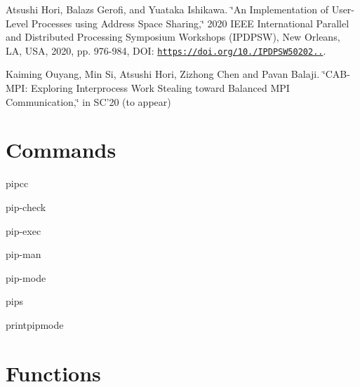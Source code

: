 Atsushi Hori, Balazs Gerofi, and Yuataka Ishikawa. \char`\"{}\-An Implementation
of User-\/\-Level Processes using Address Space Sharing,\char`\"{} 2020 I\-E\-E\-E International Parallel and Distributed Processing Symposium Workshops (I\-P\-D\-P\-S\-W), New Orleans, L\-A, U\-S\-A, 2020, pp. 976-\/984, D\-O\-I\-: \href{https://doi.org/10.1109/IPDPSW50202.2020.00161}{\tt https\-://doi.\-org/10./\-I\-P\-D\-P\-S\-W50202..}.

Kaiming Ouyang, Min Si, Atsushi Hori, Zizhong Chen and Pavan Balaji. \char`\"{}\-C\-A\-B-\/\-M\-P\-I\-: Exploring Interprocess Work Stealing toward Balanced
\-M\-P\-I Communication,\char`\"{} in S\-C’20 (to appear)

\section*{Commands}


\begin{DoxyItemize}
\item pipcc
\item pip-\/check
\item pip-\/exec
\item pip-\/man
\item pip-\/mode
\item pips
\item printpipmode
\end{DoxyItemize}

\section*{Functions}


